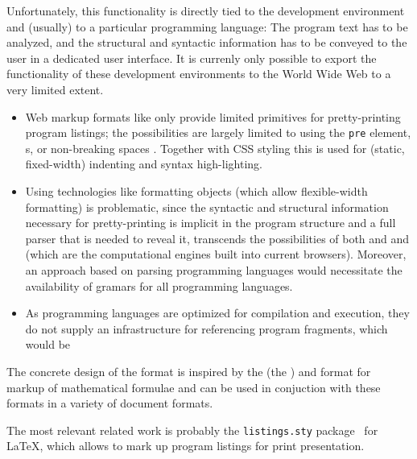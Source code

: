 Unfortunately, this functionality is directly tied to the development environment
and (usually) to a particular programming language: The program text has to be
analyzed, and the structural and syntactic information has to be conveyed to the
user in a dedicated user interface. It is currenly only possible to export the
functionality of these development environments to the World Wide Web to a very
limited extent. 
\begin{itemize}
\item Web markup formats like {\html} only provide limited primitives for
  pretty-printing program listings; the possibilities are largely limited to using
  the
  {\tt{pre}} element, {s}, or non-breaking spaces {}.
  Together with CSS styling this is used for (static, fixed-width) indenting and
  syntax high-lighting.
\item Using technologies like {\xsl} formatting objects (which allow
  flexible-width formatting) is problematic, since the
  syntactic and structural information necessary for pretty-printing is implicit
  in the program structure and a full parser that is needed to reveal it,
  transcends the possibilities of both {} and and {\xslt} (which
  are the computational engines built into current browsers). Moreover, an
  approach based on parsing programming languages would necessitate the
  availability of gramars for all programming languages. 
\item As programming languages are optimized for compilation and execution, they
  do not supply an infrastructure for referencing program fragments, which would
  be
\end{itemize}


The concrete design of the {\codeml} format is inspired by the
{\mathml} (the {})
and {\openmath} format for markup of mathematical formulae and can be used in conjuction with these formats in a variety of
document formats.


The most relevant related work is probably the {\tt{listings.sty}}
package~\cite{Heinz:tlp02} for {\LaTeX}, which allows to mark up program listings
for print presentation.


